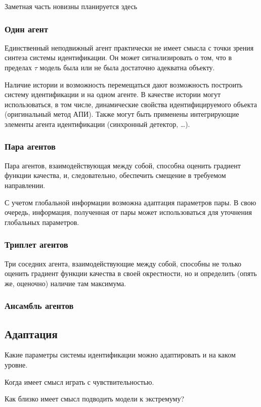 \documentclass[a4paper,12pt]{article}
\newcommand{\Cmt}[1]{ {\small\color{red}#1} }
\begin{document}
\Cmt{ Заметная часть новизны планируется здесь}

\subsubsection{Один агент}

Единственный неподвижный агент практически не имеет смысла
с точки зрения синтеза системы идентификации.
Он может сигнализировать о том, что в пределах
\(\tau\) модель была или не была достаточно адекватна
объекту.

Наличие истории и возможность перемещаться дают возможность
построить систему идентификации и на одном агенте.
В качестве истории могут использоваться, в том числе,
динамические свойства идентифицируемого объекта
(оригинальный метод АПИ). Также могут быть
применены интегрирующие элементы агента идентификации
(синхронный детектор, \ldots).

\subsubsection{Пара агентов}

Пара агентов, взаимодействующая между собой,
способна оценить градиент функции качества,
и, следовательно, обеспечить смещение в требуемом направлении.

С учетом глобальной информации возможна адаптация параметров пары.
В свою очередь, информация, полученная от пары может
использоваться для уточнения глобальных параметров.

\subsubsection{Триплет агентов}

Три соседних агента, взаимодействующие между собой,
способны не только оценить градиент функции качества в своей окрестности,
но и определить (опять же, оценочно) наличие там максимума.

\subsubsection{Ансамбль агентов}

\subsection{Адаптация}

\Cmt{
Какие параметры системы идентификации можно адаптировать
и на каком уровне.

Когда имеет смысл играть с чувствительностью.

Как близко имеет смысл подводить модели к экстремуму?
}
\end{document}
